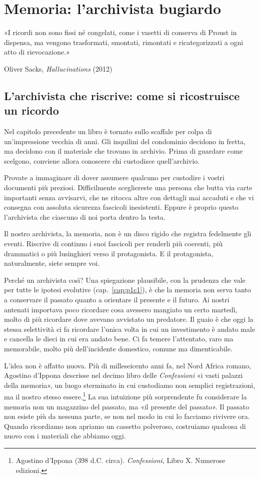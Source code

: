 \chapter{Memoria: l'archivista bugiardo}
\label{cap:p1c6}

\epigraph{«I ricordi non sono fissi né congelati, come i vasetti di conserva di Proust in dispensa, ma vengono trasformati, smontati, rimontati e ricategorizzati a ogni atto di rievocazione.»}{Oliver Sacks, \textit{Hallucinations} (2012)}

\section{L'archivista che riscrive: come si ricostruisce un ricordo}

Nel capitolo precedente un libro è tornato sullo scaffale per colpa di un'impressione vecchia di anni. Gli inquilini del condominio decidono in fretta, ma decidono con il materiale che trovano in archivio. Prima di guardare come scelgono, conviene allora conoscere chi custodisce quell'archivio.

Provate a immaginare di dover assumere qualcuno per custodire i vostri documenti più preziosi. Difficilmente scegliereste una persona che butta via carte importanti senza avvisarvi, che ne ritocca altre con dettagli mai accaduti e che vi consegna con assoluta sicurezza fascicoli inesistenti. Eppure è proprio questo l'archivista che ciascuno di noi porta dentro la testa.

Il nostro archivista, la memoria, non è un disco rigido che registra fedelmente gli eventi. Riscrive di continuo i suoi fascicoli per renderli più coerenti, più drammatici o più lusinghieri verso il protagonista. E il protagonista, naturalmente, siete sempre voi.

Perché un archivista così? Una spiegazione plausibile, con la prudenza che vale per tutte le ipotesi evolutive (cap.~\ref{cap:p1c1}), è che la memoria non serva tanto a conservare il passato quanto a orientare il presente e il futuro. Ai nostri antenati importava poco ricordare cosa avessero mangiato un certo martedì, molto di più ricordare dove avevano avvistato un predatore. Il guaio è che oggi la stessa selettività ci fa ricordare l'unica volta in cui un investimento è andato male e cancella le dieci in cui era andato bene. Ci fa temere l'attentato, raro ma memorabile, molto più dell'incidente domestico, comune ma dimenticabile.

L'idea non è affatto nuova. Più di milleseicento anni fa, nel Nord Africa romano, Agostino d'Ippona descrisse nel decimo libro delle \textit{Confessioni} «i vasti palazzi della memoria», un luogo sterminato in cui custodiamo non semplici registrazioni, ma il nostro stesso essere.\footnote{Agostino d'Ippona (398 d.C. circa). \textit{Confessioni}, Libro X. Numerose edizioni.} La sua intuizione più sorprendente fu considerare la memoria non un magazzino del passato, ma «il presente del passato». Il passato non esiste più da nessuna parte, se non nel modo in cui lo facciamo rivivere ora. Quando ricordiamo non apriamo un cassetto polveroso, costruiamo qualcosa di nuovo con i materiali che abbiamo oggi.

